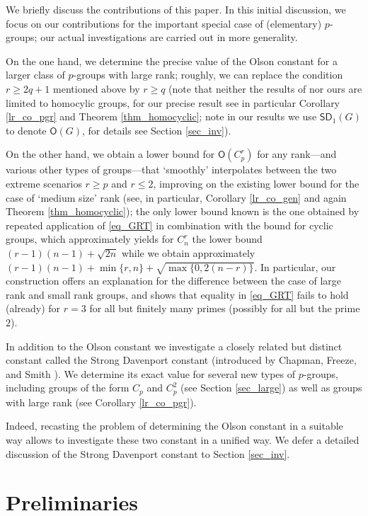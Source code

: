 \documentclass{amsart}
\theoremstyle{definition}
\numberwithin{equation}{section}
\begin{document}
We briefly discuss the contributions of this paper. In this initial discussion, we focus on our contributions for the important special case of (elementary) $p$-groups; our actual investigations are carried out in more generality.

On the one hand, we determine the precise value of the Olson constant for
a larger class of $p$-groups with large rank; roughly, we can replace the condition $r \ge 2q +1$ mentioned above by $r\ge q$ (note that neither the results of \cite{GaoGe} nor ours are limited to homocylic groups, for our precise result see in particular Corollary \ref{lr_co_pgr} and Theorem \ref{thm_homocyclic}; note in our results we use ${\mathsf{SD}}_1(G)$ to denote ${\mathsf{O}}(G)$, for details see Section \ref{sec_inv}).

On the other hand, we obtain a lower bound for ${\mathsf{O}}(C_p^r)$ for any rank---and various other types of groups---that  `smoothly' interpolates between the two extreme scenarios $ r\ge p$  and $r\le 2$, improving on the existing lower bound for the case of `medium size' rank (see, in particular, Corollary \ref{lr_co_gen} and again Theorem \ref{thm_homocyclic}); the only lower bound known is the one obtained by repeated application of \eqref{eq_GRT} in combination with the bound for cyclic groups, which approximately
yields for $C_n^r$ the lower bound $(r-1)(n-1) + \sqrt{2n}$ while we obtain approximately
$(r-1)(n-1) + \min \{r,n\} + \sqrt{\max \{0, 2(n-r)\} }$.
 In particular, our construction offers
an explanation for the difference between the case of large rank and small rank groups, and shows that equality in \eqref{eq_GRT} fails to hold (already) for $r=3$ for all but finitely many primes (possibly for all but the prime $2$).

In addition to the Olson constant we investigate a closely related but distinct constant called the Strong Davenport constant (introduced by Chapman, Freeze, and Smith \cite{CFS}). We determine its exact value for several new types of $p$-groups, including groups of the form $C_p$ and $C_p^2$ (see Section \ref{sec_large}) as well as groups with large rank (see Corollary \ref{lr_co_pgr}).

Indeed, recasting the problem of determining the Olson constant in a suitable way allows to investigate these two constant in a unified way.
We defer a detailed discussion of the Strong Davenport constant to Section \ref{sec_inv}.

\section{Preliminaries}
\label{sec_prel}
\end{document}
